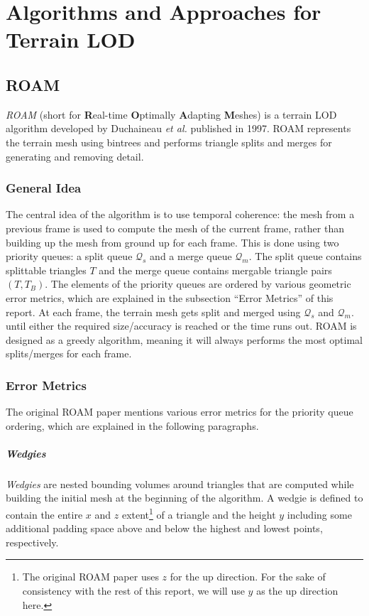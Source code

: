 \chapter{Algorithms and Approaches for Terrain LOD}
\section{ROAM}
\textit{ROAM} (short for \textbf{R}eal-time \textbf{O}ptimally \textbf{A}dapting \textbf{M}eshes) 
is a terrain LOD algorithm developed by Duchaineau \textit{et al.} \cite{roam} published in 1997.
ROAM represents the terrain mesh using bintrees and performs triangle splits and merges
for generating and removing detail. 

\subsection{General Idea}
The central idea of the algorithm is to use temporal coherence: the mesh from a previous frame is used to compute 
the mesh of the current frame, rather than building up the mesh from ground up for each frame.
This is done using two priority queues: a split queue $\mathcal{Q}_s$ and a merge queue $\mathcal{Q}_m$.
The split queue contains splittable triangles $T$
and the merge queue contains mergable triangle pairs $(T,T_B)$.
The elements of the priority queues are ordered by 
various geometric error metrics, which are explained in the subsection ``Error Metrics'' of this report.
At each frame, the terrain mesh gets split and merged using $\mathcal{Q}_s$ and $\mathcal{Q}_m$. until either the required size/accuracy is reached
or the time runs out.
ROAM is designed as a greedy algorithm, meaning it will always performs the most optimal splits/merges for each frame.

\subsection{Error Metrics}
The original ROAM paper mentions various error metrics for the priority queue ordering,
which are explained in the following paragraphs.

\paragraph{Wedgies} \textit{Wedgies} are nested bounding volumes around triangles that are computed 
while building the initial mesh at the beginning of the algorithm.
A wedgie is defined to contain the entire $x$ and $z$ extent\footnote{The original ROAM paper uses $z$ for the up direction. For the sake of consistency with the rest of this report, we will use $y$ as the up direction here.}
of a triangle and the height $y$ including some additional padding space above and below the highest and lowest points,
respectively.

